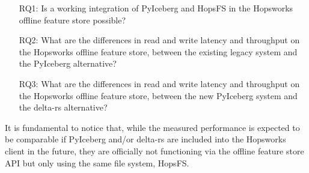 \begin{enumerate}
    \item[RQ1:] Is a working integration of PyIceberg and HopsFS in the Hopsworks offline feature store possible?
    \item[RQ2:] What are the differences in read and write latency and throughput on the Hopsworks offline feature store, between the existing legacy system and the PyIceberg alternative?
    \item[RQ3:] What are the differences in read and write latency and throughput on the Hopsworks offline feature store, between the new PyIceberg system and the delta-rs alternative?
\end{enumerate}

It is fundamental to notice that, while the measured performance is expected to be comparable if PyIceberg and/or delta-rs are included into the Hopsworks client in the future, they are officially not functioning via the offline feature store \gls{API} but only using the same file system, \gls{HopsFS}.